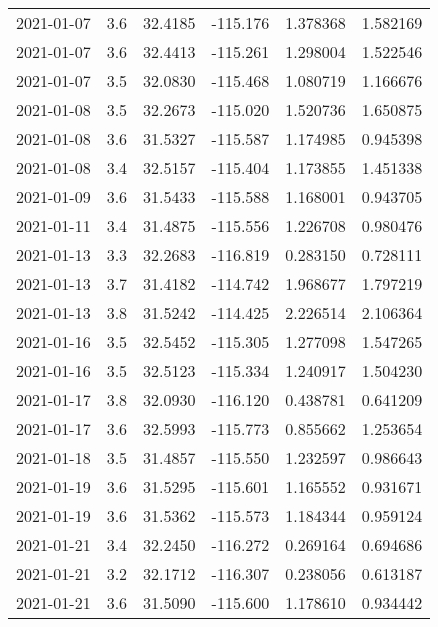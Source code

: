 \begin{tabular}{lrrrrr}
2021-01-07 &       3.6 &  32.4185 &  -115.176 &         1.378368 &         1.582169 \\
2021-01-07 &       3.6 &  32.4413 &  -115.261 &         1.298004 &         1.522546 \\
2021-01-07 &       3.5 &  32.0830 &  -115.468 &         1.080719 &         1.166676 \\
2021-01-08 &       3.5 &  32.2673 &  -115.020 &         1.520736 &         1.650875 \\
2021-01-08 &       3.6 &  31.5327 &  -115.587 &         1.174985 &         0.945398 \\
2021-01-08 &       3.4 &  32.5157 &  -115.404 &         1.173855 &         1.451338 \\
2021-01-09 &       3.6 &  31.5433 &  -115.588 &         1.168001 &         0.943705 \\
2021-01-11 &       3.4 &  31.4875 &  -115.556 &         1.226708 &         0.980476 \\
2021-01-13 &       3.3 &  32.2683 &  -116.819 &         0.283150 &         0.728111 \\
2021-01-13 &       3.7 &  31.4182 &  -114.742 &         1.968677 &         1.797219 \\
2021-01-13 &       3.8 &  31.5242 &  -114.425 &         2.226514 &         2.106364 \\
2021-01-16 &       3.5 &  32.5452 &  -115.305 &         1.277098 &         1.547265 \\
2021-01-16 &       3.5 &  32.5123 &  -115.334 &         1.240917 &         1.504230 \\
2021-01-17 &       3.8 &  32.0930 &  -116.120 &         0.438781 &         0.641209 \\
2021-01-17 &       3.6 &  32.5993 &  -115.773 &         0.855662 &         1.253654 \\
2021-01-18 &       3.5 &  31.4857 &  -115.550 &         1.232597 &         0.986643 \\
2021-01-19 &       3.6 &  31.5295 &  -115.601 &         1.165552 &         0.931671 \\
2021-01-19 &       3.6 &  31.5362 &  -115.573 &         1.184344 &         0.959124 \\
2021-01-21 &       3.4 &  32.2450 &  -116.272 &         0.269164 &         0.694686 \\
2021-01-21 &       3.2 &  32.1712 &  -116.307 &         0.238056 &         0.613187 \\
2021-01-21 &       3.6 &  31.5090 &  -115.600 &         1.178610 &         0.934442 \\

\end{tabular}

